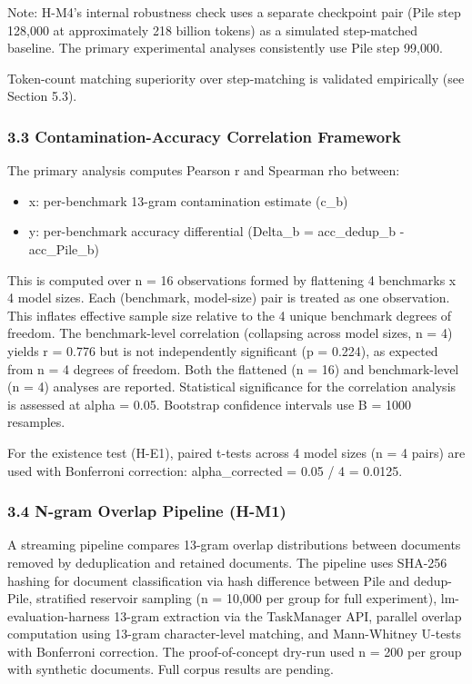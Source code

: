Note: H-M4's internal robustness check uses a separate checkpoint pair (Pile step 128,000 at approximately 218 billion tokens) as a simulated step-matched baseline. The primary experimental analyses consistently use Pile step 99,000.

Token-count matching superiority over step-matching is validated empirically (see Section 5.3).

\subsubsection{3.3 Contamination-Accuracy Correlation Framework}

The primary analysis computes Pearson r and Spearman rho between:
\begin{itemize}
\item x: per-benchmark 13-gram contamination estimate (c\_b)
\item y: per-benchmark accuracy differential (Delta\_b = acc\_dedup\_b - acc\_Pile\_b)
\end{itemize}

This is computed over n = 16 observations formed by flattening 4 benchmarks x 4 model sizes. Each (benchmark, model-size) pair is treated as one observation. This inflates effective sample size relative to the 4 unique benchmark degrees of freedom. The benchmark-level correlation (collapsing across model sizes, n = 4) yields r = 0.776 but is not independently significant (p = 0.224), as expected from n = 4 degrees of freedom. Both the flattened (n = 16) and benchmark-level (n = 4) analyses are reported. Statistical significance for the correlation analysis is assessed at alpha = 0.05. Bootstrap confidence intervals use B = 1000 resamples.

For the existence test (H-E1), paired t-tests across 4 model sizes (n = 4 pairs) are used with Bonferroni correction: alpha\_corrected = 0.05 / 4 = 0.0125.

\subsubsection{3.4 N-gram Overlap Pipeline (H-M1)}

A streaming pipeline compares 13-gram overlap distributions between documents removed by deduplication and retained documents. The pipeline uses SHA-256 hashing for document classification via hash difference between Pile and dedup-Pile, stratified reservoir sampling (n = 10,000 per group for full experiment), lm-evaluation-harness 13-gram extraction via the TaskManager API, parallel overlap computation using 13-gram character-level matching, and Mann-Whitney U-tests with Bonferroni correction. The proof-of-concept dry-run used n = 200 per group with synthetic documents. Full corpus results are pending.

